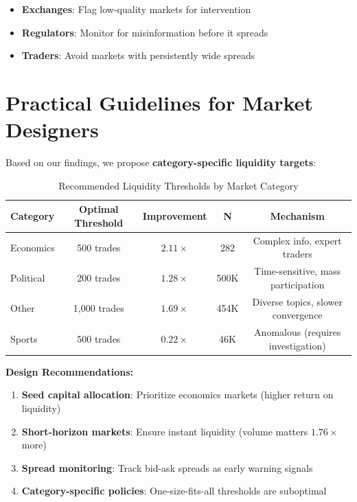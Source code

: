 \documentclass[12pt,letterpaper]{article}
\begin{document}
\begin{itemize}
    \item \textbf{Exchanges}: Flag low-quality markets for intervention
    \item \textbf{Regulators}: Monitor for misinformation before it spreads
    \item \textbf{Traders}: Avoid markets with persistently wide spreads
\end{itemize}

\clearpage
\section{Practical Guidelines for Market Designers}\label{sec:guidelines}

Based on our findings, we propose \textbf{category-specific liquidity targets}:

\begin{table}[ht]
\centering
\caption{Recommended Liquidity Thresholds by Market Category}
\label{tab:category-thresholds}
\begin{tabular}{lcccc}
\toprule
\textbf{Category} & \textbf{Optimal Threshold} & \textbf{Improvement} & \textbf{N} & \textbf{Mechanism} \\
\midrule
Economics & 500 trades & $2.11\times$ & 282 & Complex info, expert traders \\
Political & 200 trades & $1.28\times$ & 500K & Time-sensitive, mass participation \\
Other & 1,000 trades & $1.69\times$ & 454K & Diverse topics, slower convergence \\
Sports & 500 trades & $0.22\times$ & 46K & Anomalous (requires investigation) \\
\bottomrule
\end{tabular}
\end{table}

\textbf{Design Recommendations:}

\begin{enumerate}
    \item \textbf{Seed capital allocation}: Prioritize economics markets (higher return 
          on liquidity)
    \item \textbf{Short-horizon markets}: Ensure instant liquidity (volume matters 
          $1.76\times$ more)
    \item \textbf{Spread monitoring}: Track bid-ask spreads as early warning signals
    \item \textbf{Category-specific policies}: One-size-fits-all thresholds are 
          suboptimal
\end{enumerate}
\end{document}
